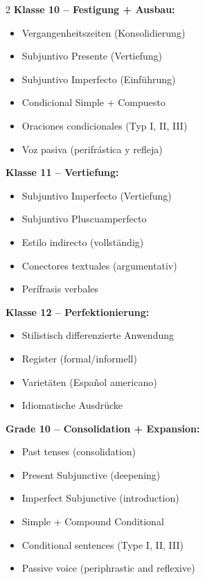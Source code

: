 \documentclass[10pt,a4paper]{article}
\begin{document}
\vspace{2mm}

\begin{paracol}{2}
\small
\textbf{Klasse 10 -- Festigung + Ausbau:}
\begin{itemize}[noitemsep,topsep=2pt]
\item Vergangenheitszeiten (Konsolidierung)
\item Subjuntivo Presente (Vertiefung)
\item Subjuntivo Imperfecto (Einführung)
\item Condicional Simple + Compuesto
\item Oraciones condicionales (Typ I, II, III)
\item Voz pasiva (perifrástica y refleja)
\end{itemize}

\textbf{Klasse 11 -- Vertiefung:}
\begin{itemize}[noitemsep,topsep=2pt]
\item Subjuntivo Imperfecto (Vertiefung)
\item Subjuntivo Pluscuamperfecto
\item Estilo indirecto (vollständig)
\item Conectores textuales (argumentativ)
\item Perífrasis verbales
\end{itemize}

\textbf{Klasse 12 -- Perfektionierung:}
\begin{itemize}[noitemsep,topsep=2pt]
\item Stilistisch differenzierte Anwendung
\item Register (formal/informell)
\item Varietäten (Español americano)
\item Idiomatische Ausdrücke
\end{itemize}

\switchcolumn

\small\color{english}
\textbf{Grade 10 -- Consolidation + Expansion:}
\begin{itemize}[noitemsep,topsep=2pt]
\item Past tenses (consolidation)
\item Present Subjunctive (deepening)
\item Imperfect Subjunctive (introduction)
\item Simple + Compound Conditional
\item Conditional sentences (Type I, II, III)
\item Passive voice (periphrastic and reflexive)
\end{itemize}


\end{paracol}
\end{document}

